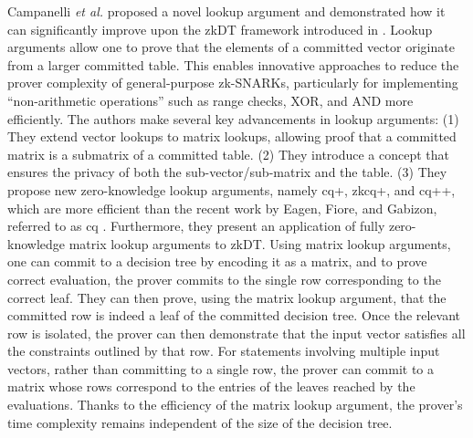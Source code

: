 \documentclass[journal]{IEEEtran}
\begin{document}
Campanelli \emph{et al.} \cite{campanelli2024lookup} proposed a novel lookup argument and demonstrated how it can significantly improve upon the zkDT framework introduced in \cite{zhang2020zero}. Lookup arguments allow one to prove that the elements of a committed vector originate from a larger committed table. This enables innovative approaches to reduce the prover complexity of general-purpose zk-SNARKs, particularly for implementing ``non-arithmetic operations'' such as range checks, XOR, and AND more efficiently. The authors make several key advancements in lookup arguments: (1) They extend vector lookups to matrix lookups, allowing proof that a committed matrix is a submatrix of a committed table.
(2) They introduce a concept that ensures the privacy of both the sub-vector/sub-matrix and the table. (3) They propose new zero-knowledge lookup arguments, namely cq+, zkcq+, and cq++, which are more efficient than the recent work by Eagen, Fiore, and Gabizon, referred to as cq \cite{eagen2022cq}. Furthermore, they present an application of fully zero-knowledge matrix lookup arguments to zkDT. Using matrix lookup arguments, one can commit to a decision tree by encoding it as a matrix, and to prove correct evaluation, the prover commits to the single row corresponding to the correct leaf. They can then prove, using the matrix lookup argument, that the committed row is indeed a leaf of the committed decision tree. Once the relevant row is isolated, the prover can then demonstrate that the input vector satisfies all the constraints outlined by that row. For statements involving multiple input vectors, rather than committing to a single row, the prover can commit to a matrix whose rows correspond to the entries of the leaves reached by the evaluations. Thanks to the efficiency of the matrix lookup argument, the prover's time complexity remains independent of the size of the decision tree.
\end{document}
